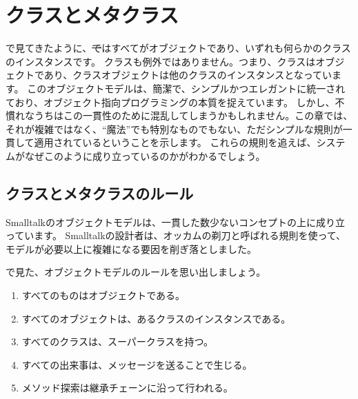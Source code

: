 \documentclass[a4paper,10pt,twoside]{book}
\begin{document}
	\renewcommand{\nnbb}[2]{} %
	\sloppy
\fi
\chapter{クラスとメタクラス}


で見てきたように、\st ではすべてがオブジェクトであり、いずれも何らかのクラスのインスタンスです。
クラスも例外ではありません。つまり、クラスはオブジェクトであり、クラスオブジェクトは他のクラスのインスタンスとなっています。
このオブジェクトモデルは、簡潔で、シンプルかつエレガントに統一されており、オブジェクト指向プログラミングの本質を捉えています。
しかし、不慣れなうちはこの一貫性のために混乱してしまうかもしれません。この章では、それが複雑ではなく、``魔法''でも特別なものでもない、ただシンプルな規則が一貫して適用されているということを示します。
これらの規則を追えば、システムがなぜこのように成り立っているのかがわかるでしょう。

\section{クラスとメタクラスのルール}

Smalltalkのオブジェクトモデルは、一貫した数少ないコンセプトの上に成り立っています。
Smalltalkの設計者は、オッカムの剃刀と呼ばれる規則を使って、モデルが必要以上に複雑になる要因を削ぎ落としました。

で見た、オブジェクトモデルのルールを思い出しましょう。

\begin{enumerate}[label={\textbf{Rule \arabic{*}}.}, ref={Rule \arabic{*}}, leftmargin=*, widest=10]
\item{} %
	すべてのものはオブジェクトである。

\item{} %
	すべてのオブジェクトは、あるクラスのインスタンスである。

\item{} %
	すべてのクラスは、スーパークラスを持つ。

\item{} %
	すべての出来事は、メッセージを送ることで生じる。

\item{} %
	メソッド探索は継承チェーンに沿って行われる。

\end{enumerate}
\end{document}
